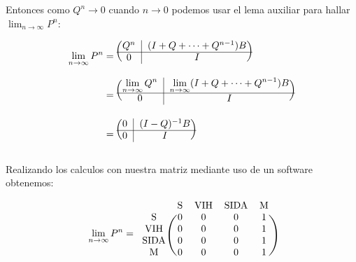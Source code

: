\documentclass[11pt]{article}
\begin{document}
Entonces como $ Q^n \rightarrow 0 $ cuando $ n \rightarrow 0 $ podemos usar el lema auxiliar
para hallar $ \displaystyle\lim_{n \rightarrow \infty} P^n $:

\begin{align*}
  \displaystyle\lim_{n \rightarrow \infty} P^n &=
  \begin{blockarray}{cc}
    \begin{block}{(c|c)}
     Q^n & (I + Q + \dots + Q^{n-1})B \\
     \cline{1-2}
     0 & I \\
    \end{block}
   \end{blockarray} \\
  & =
  \begin{blockarray}{cc}
    \begin{block}{(c|c)}
     \displaystyle\lim_{n \rightarrow \infty} Q^n & \displaystyle\lim_{n \rightarrow \infty} (I + Q + \dots + Q^{n-1})B \\
     \cline{1-2}
     0 & I \\
    \end{block}
   \end{blockarray} \\
  & = 
  \begin{blockarray}{cc}
    \begin{block}{(c|c)}
     0 & (I - Q)^{-1}B \\
     \cline{1-2}
     0 & I \\
    \end{block}
  \end{blockarray} \\
\end{align*}

Realizando los calculos con nuestra matriz mediante uso de un software obtenemos:

\begin{equation*}
  \displaystyle\lim_{n \rightarrow \infty} P^n =
  \begin{blockarray}{ccccc}
    & \text{S} & \text{VIH} & \text{SIDA} & \text{M} \\
   \begin{block}{c(cccc)}
     \text{S}    & 0 & 0 & 0 & 1 \\
     \text{VIH}  & 0 & 0 & 0 & 1 \\
     \text{SIDA} & 0 & 0 & 0 & 1 \\
     \text{M}    & 0 & 0 & 0 & 1 \\
   \end{block}
 \end{blockarray}
\end{equation*}
\end{document}
